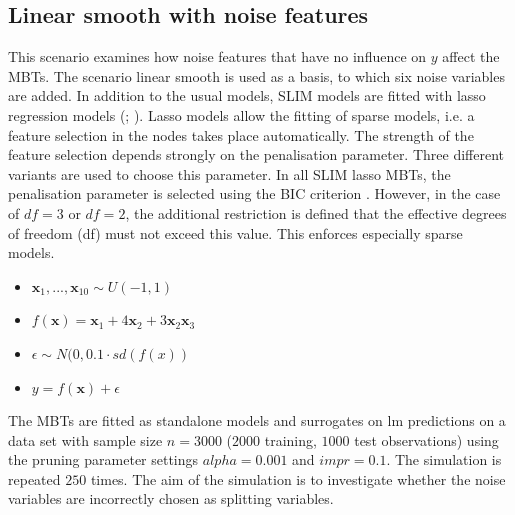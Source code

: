\newpage

\subsection{Linear smooth with noise features}
This scenario examines how noise features that have no influence on $y$ affect the MBTs. The scenario linear smooth is used as a basis, to which six noise variables are added.
In addition to the usual models, SLIM models are fitted with lasso regression models (\citealp{Tibshirani.1996};  \citealp{Friedman.2010}). Lasso models allow the fitting of sparse models, i.e. a feature selection in the nodes takes place automatically. The strength of the feature selection depends strongly on the penalisation parameter. Three different variants are used to choose this parameter. In all SLIM lasso MBTs, the penalisation parameter is selected using the BIC criterion \citep{Sabourin.2015}. However, in the case of $df = 3$ or $df = 2$, the additional restriction is defined that the effective degrees of freedom (df) must not exceed this value. This enforces especially sparse models.

\begin{itemize}
    \item $\textbf{x}_1,..., \textbf{x}_{10} \sim U(-1,1)$
    \item $ f(\textbf{x}) = \textbf{x}_1 + 4   \textbf{x}_2 + 3   \textbf{x}_2   \textbf{x}_3 $
    \item $\epsilon \sim N(0, 0.1 \cdot sd(f(x))$
    \item $y = f(\textbf{x}) + \epsilon$
\end{itemize}


The MBTs are fitted as standalone models and surrogates on lm predictions on a data set with sample size $ n = 3000$ ($2000$ training, $1000$ test observations) using the pruning parameter settings $alpha = 0.001$ and $impr = 0.1$. The simulation is repeated $250$ times.
The aim of the simulation is to investigate whether the noise variables are incorrectly chosen as splitting variables.


